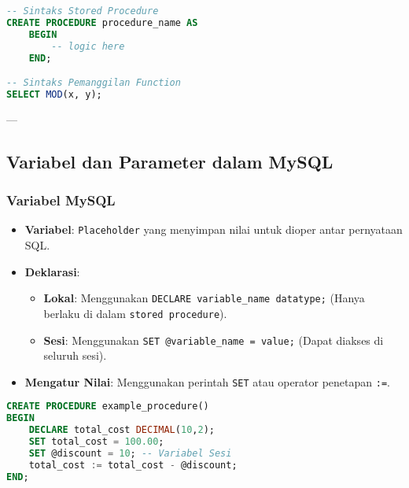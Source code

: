 \documentclass{article}
\begin{document}
\begin{lstlisting}[language=SQL, caption={Sintaks Dasar}, captionpos=b]
-- Sintaks Stored Procedure
CREATE PROCEDURE procedure_name AS
    BEGIN
        -- logic here
    END;

-- Sintaks Pemanggilan Function
SELECT MOD(x, y);
\end{lstlisting}

---

\subsection{Variabel dan Parameter dalam MySQL}

\subsubsection{Variabel MySQL}
\begin{itemize}
    \item \textbf{Variabel}: \texttt{Placeholder} yang menyimpan nilai untuk dioper antar pernyataan SQL.
    \item \textbf{Deklarasi}:
          \begin{itemize}
              \item \textbf{Lokal}: Menggunakan \texttt{DECLARE variable\_name datatype;} (Hanya berlaku di dalam \texttt{stored procedure}).
              \item \textbf{Sesi}: Menggunakan \texttt{SET @variable\_name = value;} (Dapat diakses di seluruh sesi).
          \end{itemize}
    \item \textbf{Mengatur Nilai}: Menggunakan perintah \texttt{SET} atau operator penetapan \texttt{:=}.
\end{itemize}
\begin{lstlisting}[language=SQL, caption={Contoh Variabel di Stored Procedure}, captionpos=b]
CREATE PROCEDURE example_procedure()
BEGIN
    DECLARE total_cost DECIMAL(10,2);
    SET total_cost = 100.00;
    SET @discount = 10; -- Variabel Sesi
    total_cost := total_cost - @discount;
END;
\end{lstlisting}
\end{document}

